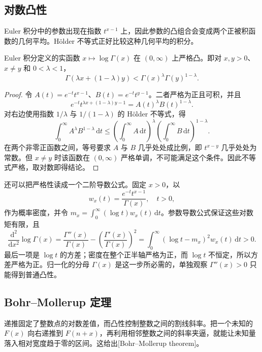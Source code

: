 \subsection{对数凸性}
\label{b3:subsec:210103}

Euler 积分中的参数出现在指数 \(t^{x-1}\) 上，因此参数的凸组合会变成两个正被积函数的几何平均。Hölder 不等式正好比较这种几何平均的积分。

\begin{proposition}[严格对数凸性]\label{b3:prop:21-logconvex}
Euler 积分定义的实函数 \(x\mapsto\log\Gamma(x)\) 在 \((0,\infty)\) 上严格凸。即对 \(x,y>0\)、\(x\ne y\) 和 \(0<\lambda<1\)，
\[
 \Gamma(\lambda x+(1-\lambda)y)
 <\Gamma(x)^\lambda\Gamma(y)^{1-\lambda}.
\]
\end{proposition}
\begin{proof}
令 \(A(t)=e^{-t}t^{x-1}\)、\(B(t)=e^{-t}t^{y-1}\)。二者严格为正且可积，并且
\[
 e^{-t}t^{\lambda x+(1-\lambda)y-1}
 =A(t)^\lambda B(t)^{1-\lambda}.
\]
对右边使用指数 \(1/\lambda\) 与 \(1/(1-\lambda)\) 的 Hölder 不等式，得
\[
 \int_0^\infty A^\lambda B^{1-\lambda}\,\mathrm{d}t
 \le\left(\int_0^\infty A\,\mathrm{d}t\right)^\lambda
      \left(\int_0^\infty B\,\mathrm{d}t\right)^{1-\lambda}.
\]
在两个非零正函数之间，等号要求 \(A\) 与 \(B\) 几乎处处成比例，即 \(t^{x-y}\) 几乎处处为常数。但 \(x\ne y\) 时该函数在 \((0,\infty)\) 严格单调，不可能满足这个条件。因此不等式严格，取对数即得结论。
\end{proof}
还可以把严格性读成一个二阶导数公式。固定 \(x>0\)，以
\[
 w_x(t)=\frac{e^{-t}t^{x-1}}{\Gamma(x)},\quad t>0,
\]
作为概率密度，并令 \(m_x=\int_0^\infty(\log t)w_x(t)\,\mathrm{d}t\)。参数导数公式保证这些对数矩有限，且
\[
 \frac{\mathrm{d}^2}{\mathrm{d}x^2}\log\Gamma(x)
 =\frac{\Gamma''(x)}{\Gamma(x)}
  -\left(\frac{\Gamma'(x)}{\Gamma(x)}\right)^2
 =\int_0^\infty(\log t-m_x)^2w_x(t)\,\mathrm{d}t>0.
\]
最后一项是 \(\log t\) 的方差；密度在整个正半轴严格为正，而 \(\log t\) 不恒定，所以方差严格为正。归一化的分母 \(\Gamma(x)\) 是这一步所必需的，单独观察 \(\Gamma''(x)>0\) 只能得到普通凸性。

\subsection{Bohr–Mollerup 定理}
\label{b3:subsec:210104}

递推固定了整数点的对数差值，而凸性控制整数之间的割线斜率。把一个未知的 \(F(x)\) 向右递推到 \(F(n+x)\)，再利用相邻整数之间的斜率夹逼，就能让未知量落入相对宽度趋于零的区间。这给出[Bohr--Mollerup theorem]。


